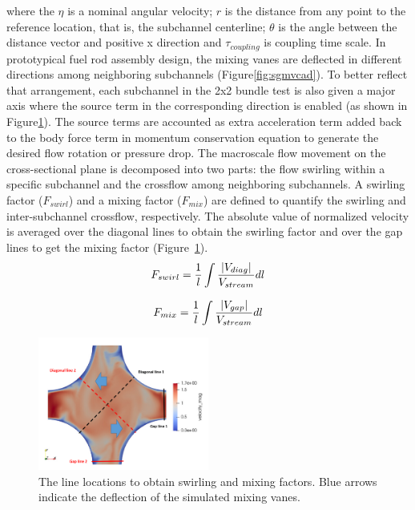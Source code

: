 where the 
$\eta$ is a nominal angular velocity; 
$r$ is the distance from any point to the reference location, that is, the subchannel centerline; 
$\theta$ is the angle between the distance vector and positive x direction and 
$\tau_{coupling}$ is coupling time scale. 
In prototypical fuel rod assembly design, the mixing vanes are deflected in different directions among neighboring subchannels (Figure\ref{fig:sgmvcad}). 
To better reflect that arrangement, each subchannel in the 2x2 bundle test is also given a major axis where the source term in the corresponding direction is enabled (as shown in Figure\ref{fig:sblines}). 
The source terms are accounted as extra acceleration term added back to the body force term in momentum conservation equation to generate the desired flow rotation or pressure drop. 
The macroscale flow movement on the cross-sectional plane is decomposed into two parts: the flow swirling within a specific subchannel and the crossflow among neighboring subchannels. 
A swirling factor ($F_{swirl}$) and a mixing factor ($F_{mix}$) are defined to quantify the swirling and inter-subchannel crossflow, respectively. 
The absolute value of normalized velocity is averaged over the diagonal lines to obtain the swirling factor and over the gap lines to get the mixing factor (Figure~\ref{fig:sblines}).
\begin{equation}
  F_{swirl} = \frac{1}{l}\int\frac{\left| V_{diag} \right|}{V_{stream}}dl\\
\end{equation}

\begin{equation}
  F_{mix} = \frac{1}{l}\int\frac{\left| V_{gap} \right|}{V_{stream}}dl\\
\end{equation}

\begin{figure}[!ht]
\centering
\includegraphics[width=0.5\textwidth]{./figures/Analysis_locations_in_a_subchannel.png}
\caption{The line locations to obtain swirling and mixing factors. Blue arrows indicate the deflection of the simulated mixing vanes. }
\label{fig:sblines}
\end{figure}

